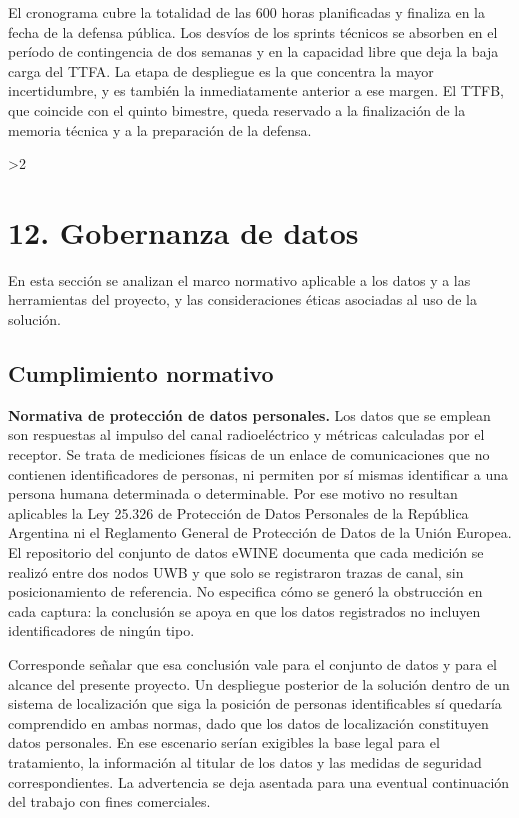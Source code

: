 \documentclass[
11pt, %
]{charter}
\providecommand{\revision}{1}
\begin{document}
El cronograma cubre la totalidad de las 600 horas planificadas y finaliza en la fecha de la defensa pública. Los desvíos de los sprints técnicos se absorben en el período de contingencia de dos semanas y en la capacidad libre que deja la baja carga del TTFA. La etapa de despliegue es la que concentra la mayor incertidumbre, y es también la inmediatamente anterior a ese margen. El TTFB, que coincide con el quinto bimestre, queda reservado a la finalización de la memoria técnica y a la preparación de la defensa.
\else\fi

\ifnum\revision>2
\section{12. Gobernanza de datos}
\label{sec:gobernanza}

En esta sección se analizan el marco normativo aplicable a los datos y a las herramientas del proyecto, y las consideraciones éticas asociadas al uso de la solución.

\subsection{Cumplimiento normativo}

\textbf{Normativa de protección de datos personales.} Los datos que se emplean son respuestas al impulso del canal radioeléctrico y métricas calculadas por el receptor. Se trata de mediciones físicas de un enlace de comunicaciones que no contienen identificadores de personas, ni permiten por sí mismas identificar a una persona humana determinada o determinable. Por ese motivo no resultan aplicables la Ley 25.326 de Protección de Datos Personales de la República Argentina ni el Reglamento General de Protección de Datos de la Unión Europea. El repositorio del conjunto de datos eWINE documenta que cada medición se realizó entre dos nodos UWB y que solo se registraron trazas de canal, sin posicionamiento de referencia. No especifica cómo se generó la obstrucción en cada captura: la conclusión se apoya en que los datos registrados no incluyen identificadores de ningún tipo.

Corresponde señalar que esa conclusión vale para el conjunto de datos y para el alcance del presente proyecto. Un despliegue posterior de la solución dentro de un sistema de localización que siga la posición de personas identificables sí quedaría comprendido en ambas normas, dado que los datos de localización constituyen datos personales. En ese escenario serían exigibles la base legal para el tratamiento, la información al titular de los datos y las medidas de seguridad correspondientes. La advertencia se deja asentada para una eventual continuación del trabajo con fines comerciales.
\end{document}
